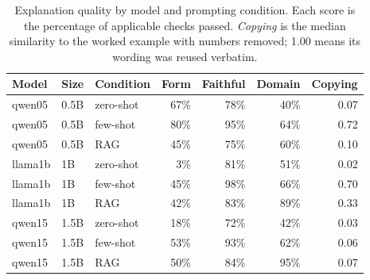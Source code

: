 \begin{table}[htbp]
\centering
\caption{Explanation quality by model and prompting condition. Each score is the percentage of applicable checks passed. \emph{Copying} is the median similarity to the worked example with numbers removed; 1.00 means its wording was reused verbatim.}
\label{tab:stage2-summary}
\begin{tabular}{lllrrrr}
\toprule
Model & Size & Condition & Form & Faithful & Domain & Copying \\
\midrule
qwen05 & 0.5B & zero-shot & 67\% & 78\% & 40\% & 0.07 \\
qwen05 & 0.5B & few-shot & 80\% & 95\% & 64\% & 0.72 \\
qwen05 & 0.5B & RAG & 45\% & 75\% & 60\% & 0.10 \\
\midrule
llama1b & 1B & zero-shot & 3\% & 81\% & 51\% & 0.02 \\
llama1b & 1B & few-shot & 45\% & 98\% & 66\% & 0.70 \\
llama1b & 1B & RAG & 42\% & 83\% & 89\% & 0.33 \\
\midrule
qwen15 & 1.5B & zero-shot & 18\% & 72\% & 42\% & 0.03 \\
qwen15 & 1.5B & few-shot & 53\% & 93\% & 62\% & 0.06 \\
qwen15 & 1.5B & RAG & 50\% & 84\% & 95\% & 0.07 \\
\bottomrule
\end{tabular}
\end{table}

